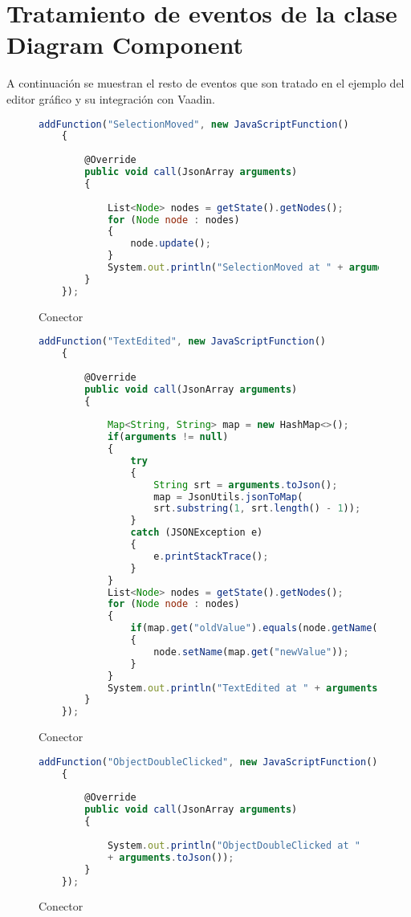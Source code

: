 \appendix
\chapter{Tratamiento de eventos de la clase Diagram Component}\label{aped.A}
A continuación se muestran el resto de eventos que son tratado en el ejemplo del editor gráfico y su integración con Vaadin.

\begin{figure}[H]
	\centering
	\begin{lstlisting}[language=Javascript]
	addFunction("SelectionMoved", new JavaScriptFunction()
	{
	
		@Override
		public void call(JsonArray arguments)
		{
		
			List<Node> nodes = getState().getNodes();
			for (Node node : nodes)
			{
				node.update();
			}
			System.out.println("SelectionMoved at " + arguments.toJson());
		}
	});\end{lstlisting}
	\caption{Conector}
	\label{fig:connector}
\end{figure}


\begin{figure}[H]
	\centering
	\begin{lstlisting}[language=Javascript]
	addFunction("TextEdited", new JavaScriptFunction()
	{
	
		@Override
		public void call(JsonArray arguments)
		{
		
			Map<String, String> map = new HashMap<>();
			if(arguments != null)
			{
				try
				{
					String srt = arguments.toJson();
					map = JsonUtils.jsonToMap(
					srt.substring(1, srt.length() - 1));
				}
				catch (JSONException e)
				{
					e.printStackTrace();
				}
			}
			List<Node> nodes = getState().getNodes();
			for (Node node : nodes)
			{
				if(map.get("oldValue").equals(node.getName()))
				{
					node.setName(map.get("newValue"));
				}	
			}
			System.out.println("TextEdited at " + arguments.toJson());
		}
	});\end{lstlisting}
	\caption{Conector}
	\label{fig:connector}
\end{figure}


\begin{figure}[H]
	\centering
	\begin{lstlisting}[language=Javascript]
	addFunction("ObjectDoubleClicked", new JavaScriptFunction()
	{
	
		@Override
		public void call(JsonArray arguments)
		{
		
			System.out.println("ObjectDoubleClicked at " 
			+ arguments.toJson());
		}
	});\end{lstlisting}
	\caption{Conector}
	\label{fig:connector}
\end{figure}
